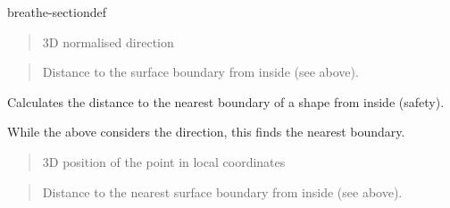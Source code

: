 \documentclass[letterpaper,10pt,english]{sphinxmanual}
\begin{document}
\begin{fulllineitems}
\begin{sphinxuseclass}{breathe-sectiondef}
\begin{fulllineitems}
\begin{quote}
\begin{description}
\sphinxAtStartPar
\sphinxstylestrong{{[}in{]}} 3D normalised direction 

\end{description}\end{quote}
\begin{quote}\begin{description}
\sphinxAtStartPar
Distance to the surface boundary from inside (see above). 

\end{description}\end{quote}


\end{fulllineitems}


\begin{fulllineitems}
\label{\detokenize{Simulation/SimulationCodeDoc:_CPPv4NK3Box13DistanceToOutEPd}}
\pysigstartsignatures
\pysigstartmultiline
{}
\pysigstopmultiline
\pysigstopsignatures
\sphinxAtStartPar
Calculates the distance to the nearest boundary of a shape from inside (safety). 

\sphinxAtStartPar
While the above considers the direction, this finds the nearest boundary.

\sphinxAtStartPar
\begin{quote}\begin{description}
\sphinxAtStartPar
\sphinxstylestrong{{[}in{]}} 3D position of the point in local coordinates 

\end{description}\end{quote}
\begin{quote}\begin{description}
\sphinxAtStartPar
Distance to the nearest surface boundary from inside (see above). 

\end{description}\end{quote}


\end{fulllineitems}



\end{sphinxuseclass}
\end{fulllineitems}
\end{document}
